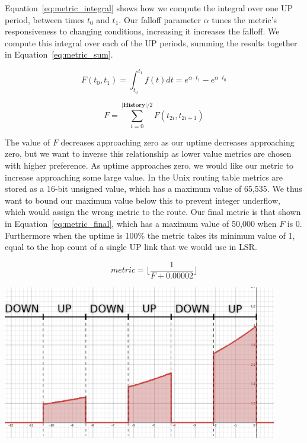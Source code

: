 \documentclass[withindex,glossary,openany]{cam-thesis}
\begin{document}
Equation~\ref{eq:metric_integral} shows how we compute the integral over one UP period, between times $t_0$ and $t_1$. Our falloff parameter $\alpha$ tunes the metric's responsiveness to changing conditions, increasing it increases the falloff. We compute this integral over each of the UP periods, summing the results together in Equation~\ref{eq:metric_sum}.

\begin{equation} \label{eq:metric_integral}
F(t_0, t_1) = \int_{t_0}^{t_1} f(t)dt = e^{\alpha \cdot t_1} - e^{\alpha \cdot t_0}
\end{equation}

\begin{equation} \label{eq:metric_sum}
F = \sum_{i = 0}^{|\textbf{History}|/2} F(t_{2i}, t_{2i+1})
\end{equation}

The value of $F$ decreases approaching zero as our uptime decreases approaching zero, but we want to inverse this relationship as lower value metrics are chosen with higher preference. As uptime approaches zero, we would like our metric to increase approaching some large value. In the Unix routing table metrics are stored as a 16-bit unsigned value, which has a maximum value of 65,535. We thus want to bound our maximum value below this to prevent integer underflow, which would assign the wrong metric to the route. Our final metric is that shown in Equation~\ref{eq:metric_final}, which has a maximum value of 50,000 when $F$ is 0. Furthermore when the uptime is 100\% the metric takes its minimum value of 1, equal to the hop count of a single UP link that we would use in LSR.

\begin{equation} \label{eq:metric_final}
\textit{metric} = \Big\lfloor\frac{1}{F+0.00002}\Big\rfloor
\end{equation}

\begin{center}
\begin{minipage}{0.9\textwidth} \centering
	\includegraphics[width=0.9\textwidth]{metric}
	\label{fig:metric}
\end{minipage}
\end{center}
\end{document}
